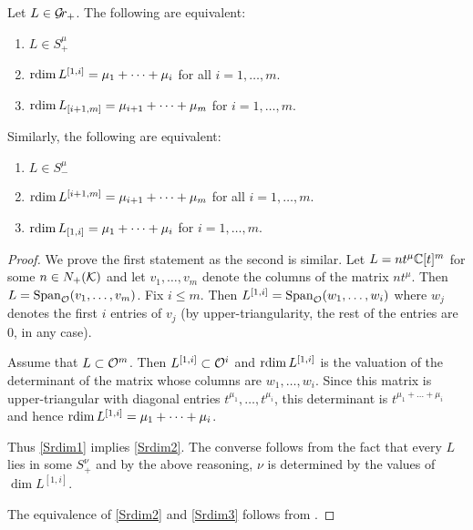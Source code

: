 \documentclass{article}
\begin{document}
\begin{lemma} \label{le:Srdim}
    Let $ L \in \mathcal{G}\!r_+$.  The following are equivalent:
    \begin{enumerate}
        \item $ L \in S_+^\mu$ \label{Srdim1}
        \item $ \operatorname{rdim} L^{[1,i]} = \mu_1 + \dots + \mu_i$ for all $ i = 1, \dots, m $. \label{Srdim2} 
        \item $ \operatorname{rdim} L_{[i+1,m]} = \mu_{i+1} + \dots + \mu_m$ for $ i  = 1, \dots, m$. \label{Srdim3}
    \end{enumerate}
    Similarly, the following are equivalent:
        \begin{enumerate}[label=\arabic*'.]
        \item $ L \in S_-^\mu$
        \item $ \operatorname{rdim} L^{[i+1,m]} = \mu_{i+1} + \dots + \mu_m$ for all $ i = 1, \dots, m $.
        \item $ \operatorname{rdim} L_{[1,i]} = \mu_{1} + \dots + \mu_i$ for $ i  = 1, \dots, m$.
    \end{enumerate}
\end{lemma}
% 
\begin{proof}
We prove the first statement as the second is similar.  Let $ L = n t^\mu \mathbb C[t]^m$ for some $ n \in N_+(\mathcal K)$ and let $ v_1, \dots, v_m $ denote the columns of the matrix $ nt^\mu$.  Then $ L = \operatorname{Span}_{\mathcal O}(v_1, \dots, v_m)$.  Fix $ i \le m$.  Then $ L^{[1,i]} = \operatorname{Span}_{\mathcal O}(w_1, \dots, w_i) $ where $ w_j $ denotes the first $ i $ entries of $ v_j $ (by upper-triangularity, the rest of the entries are 0, in any case).  

Assume that $L \subset \mathcal O^m$.  Then $ L^{[1,i]} \subset \mathcal O^i$ and $ \operatorname{rdim} L^{[1,i]} $ is the valuation of the determinant of the matrix whose columns are $ w_1, \dots, w_i$.  Since this matrix is upper-triangular with diagonal entries $ t^{\mu_1}, \dots, t^{\mu_i}$, this determinant is $ t^{\mu_1 + \dots + \mu_i} $ and hence $ \operatorname{rdim} L^{[1,i]} = \mu_1 + \dots + \mu_i$.   

Thus \cref{Srdim1} implies \cref{Srdim2}.  The converse follows from the fact that every $ L$ lies in some $ S_+^\nu$ and by the above reasoning, $ \nu$ is determined by the values of $ \dim L^{[1,i]}$.

The equivalence of \cref{Srdim2} and \cref{Srdim3} follows from .
\end{proof}

\end{document}
